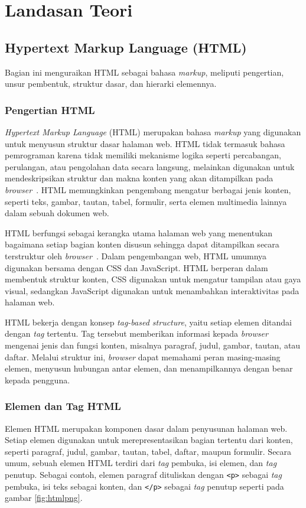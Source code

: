 \chapter{Landasan Teori}
\label{chap:teori}

\section{Hypertext Markup Language (HTML)}
\label{sec:html}
Bagian ini menguraikan HTML sebagai bahasa \textit{markup}, meliputi pengertian, unsur pembentuk, struktur dasar, dan hierarki elemennya.

\subsection{Pengertian HTML}
 
\textit{Hypertext Markup Language} (HTML) merupakan bahasa \textit{markup} yang digunakan untuk menyusun struktur dasar halaman web. HTML tidak termasuk bahasa pemrograman karena tidak memiliki mekanisme logika seperti percabangan, perulangan, atau pengolahan data secara langsung, melainkan digunakan untuk mendeskripsikan struktur dan makna konten yang akan ditampilkan pada \textit{browser}~\cite{duckett:11:htmlcss}. HTML memungkinkan pengembang mengatur berbagai jenis konten, seperti teks, gambar, tautan, tabel, formulir, serta elemen multimedia lainnya dalam sebuah dokumen web.

HTML berfungsi sebagai kerangka utama halaman web yang menentukan bagaimana setiap bagian konten disusun sehingga dapat ditampilkan secara terstruktur oleh \textit{browser}~\cite{duckett:11:htmlcss}. Dalam pengembangan web, HTML umumnya digunakan bersama dengan CSS dan JavaScript. HTML berperan dalam membentuk struktur konten, CSS digunakan untuk mengatur tampilan atau gaya visual, sedangkan JavaScript digunakan untuk menambahkan interaktivitas pada halaman web.

HTML bekerja dengan konsep \textit{tag-based structure}, yaitu setiap elemen ditandai dengan \textit{tag} tertentu. Tag tersebut memberikan informasi kepada \textit{browser} mengenai jenis dan fungsi konten, misalnya paragraf, judul, gambar, tautan, atau daftar. Melalui struktur ini, \textit{browser} dapat memahami peran masing-masing elemen, menyusun hubungan antar elemen, dan menampilkannya dengan benar kepada pengguna.

\subsection{Elemen dan Tag HTML}
Elemen HTML merupakan komponen dasar dalam penyusunan halaman web. Setiap elemen digunakan untuk merepresentasikan bagian tertentu dari konten, seperti paragraf, judul, gambar, tautan, tabel, daftar, maupun formulir. Secara umum, sebuah elemen HTML terdiri dari \textit{tag} pembuka, isi elemen, dan \textit{tag} penutup. Sebagai contoh, elemen paragraf dituliskan dengan \texttt{<p>} sebagai \textit{tag} pembuka, isi teks sebagai konten, dan \texttt{</p>} sebagai \textit{tag} penutup seperti pada gambar \ref{fig:htmlpng}.

